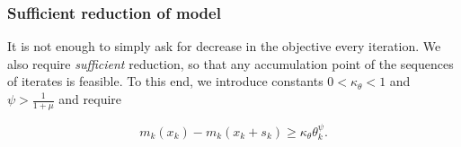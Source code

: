 \documentclass{article}
\let\oldref\ref
\renewcommand{\ref}[1]{(\oldref{#1})}
\begin{document}
\color{red}
\subsubsection{Sufficient reduction of model}
It is not enough to simply ask for decrease in the objective every iteration.
We also require \emph{sufficient} reduction, so that any accumulation point of the sequences of iterates is feasible.
To this end, we introduce constants $0 < \kappa_{\theta} < 1$ and $\psi > \frac{1}{1+\mu}$ and require

\begin{equation}
\label{predicted_decrease}
m_k(x_k) - m_k(x_k+s_k) \ge \kappa_{\theta} \theta_k^{\psi}.
\end{equation}
\color{black}








\end{document}

